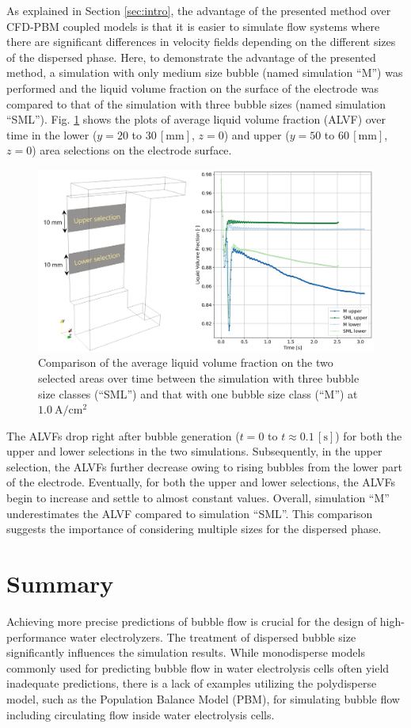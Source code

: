 \documentclass[3p, twocolumn, 10pt]{elsarticle}
\begin{document}
As explained in Section \ref{sec:intro}, the advantage of the presented method over CFD-PBM coupled models is that it is easier to simulate flow systems where there are significant differences in velocity fields depending on the different sizes of the dispersed phase.
Here, to demonstrate the advantage of the presented method, a simulation with only medium size bubble (named simulation ``M'') was performed and the liquid volume fraction on the surface of the electrode was compared to that of the simulation with three bubble sizes (named simulation ``SML'').
Fig. \ref{fig:alphaElectrode} shows the plots of average liquid volume fraction (ALVF) over time in the lower ($y=20$ to $30\,\mathrm{[mm]}$, $z=0$) and upper ($y=50$ to $60\,\mathrm{[mm]}$, $z=0$) area selections on the electrode surface.
\begin{figure}[h]
  \centering
  \includegraphics[width=1\linewidth]{Picture2.png}
  \caption{Comparison of the average liquid volume fraction on the two selected areas over time between the simulation with three bubble size classes (``SML'') and that with one bubble size class (``M'') at $1.0\ \mathrm{A/cm^2}$}
  \label{fig:alphaElectrode}
\end{figure}
The ALVFs drop right after bubble generation ($t=0$ to $t\approx0.1\,\mathrm{[s]}$) for both the upper and lower selections in the two simulations.
Subsequently, in the upper selection, the ALVFs further decrease owing to rising bubbles from the lower part of the electrode.
Eventually, for both the upper and lower selections, the ALVFs begin to increase and settle to almost constant values.
Overall, simulation ``M'' underestimates the ALVF compared to simulation ``SML''.
This comparison suggests the importance of considering multiple sizes for the dispersed phase.

\section{Summary}
Achieving more precise predictions of bubble flow is crucial for the design of high-performance water electrolyzers.
The treatment of dispersed bubble size significantly influences the simulation results.
While monodisperse models commonly used for predicting bubble flow in water electrolysis cells often yield inadequate predictions, there is a lack of examples utilizing the polydisperse model, such as the Population Balance Model (PBM), for simulating bubble flow including circulating flow inside water electrolysis cells.
\end{document}
